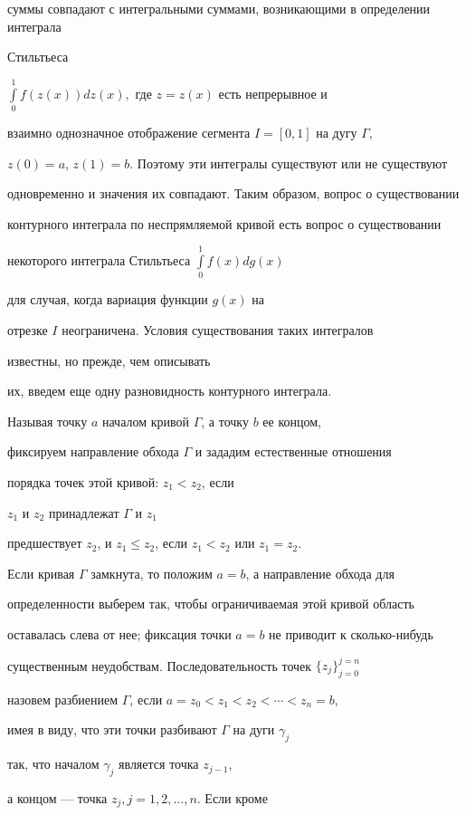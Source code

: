 суммы совпадают с интегральными суммами, возникающими в определении интеграла


Стильтьеса


$\int\limits_{0}^{1}{f(z(x))dz(x)},$ где $z=z(x)$ есть непрерывное и


взаимно однозначное отображение сегмента $I = [0,1]$ на дугу $\Gamma$,


$z(0) = a$, $z(1) = b.$ Поэтому эти интегралы существуют или не существуют


одновременно и значения их совпадают. Таким образом, вопрос о существовании


контурного интеграла по неспрямляемой кривой есть вопрос о существовании


некоторого интеграла Стильтьеса $\int\limits_{0}^{1}{f(x)dg(x)}$


для случая, когда вариация функции $g(x)$ на


отрезке $I$ неограничена. Условия существования таких интегралов


известны, но прежде, чем описывать


их, введем еще одну разновидность контурного интеграла.





Называя точку $a$ началом кривой $\Gamma$, а точку $b$ ее концом,


фиксируем направление обхода $\Gamma$ и зададим естественные отношения


порядка точек этой кривой: $z_1 < z_2$, если


$z_{1}$ и $z_{2}$ принадлежат $\Gamma$ и $z_1$


предшествует $z_2$, и $z_1\le z_2$, если $z_1 < z_2$ или $z_1 = z_2$.


Если кривая $\Gamma$ замкнута, то положим $a=b$, а направление обхода для


определенности выберем так, чтобы ограничиваемая этой кривой область


оставалась слева от нее; фиксация точки $a=b$ не приводит к сколько-нибудь


существенным неудобствам. Последовательность точек $\{z_j\}_{j=0}^{j=n}$


назовем разбиением $\Gamma$, если $a=z_0<z_1<z_2<\dotsb <z_n =b$,


имея в виду, что эти точки разбивают $\Gamma$ на дуги $\gamma_j$


так, что началом $\gamma_j$ является точка $z_{j-1}$, 


а концом --- точка $z_j, j = 1,2,\dots, n$. Если кроме


